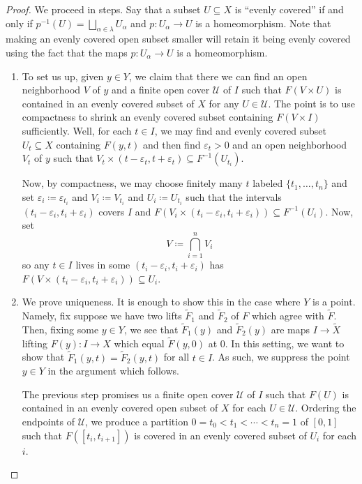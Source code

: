 \documentclass[../notes.tex]{subfiles}
\begin{document}
\begin{proof}
	We proceed in steps. Say that a subset $U\subseteq X$ is ``evenly covered'' if and only if $p^{-1}(U)=\bigsqcup_{\alpha\in\lambda}U_\alpha$ and $p\colon U_\alpha\to U$ is a homeomorphism. Note that making an evenly covered open subset smaller will retain it being evenly covered using the fact that the maps $p\colon U_\alpha\to U$ is a homeomorphism.
	\begin{enumerate}
		\item To set us up, given $y\in Y$, we claim that there we can find an open neighborhood $V$ of $y$ and a finite open cover $\mathcal U$ of $I$ such that $F(V\times U)$ is contained in an evenly covered subset of $X$ for any $U\in\mathcal U$. The point is to use compactness to shrink an evenly covered subset containing $F(V\times I)$ sufficiently. Well, for each $t\in I$, we may find and evenly covered subset $U_t\subseteq X$ containing $F(y,t)$ and then find $\varepsilon_t>0$ and an open neighborhood $V_t$ of $y$ such that $V_t\times(t-\varepsilon_t,t+\varepsilon_t)\subseteq F^{-1}(U_{t_i})$.

		Now, by compactness, we may choose finitely many $t$ labeled $\{t_1,\ldots,t_n\}$ and set $\varepsilon_i\coloneqq\varepsilon_{t_i}$ and $V_i\coloneqq V_{t_i}$ and $U_i\coloneqq U_{t_i}$ such that the intervals $(t_i-\varepsilon_i,t_i+\varepsilon_i)$ covers $I$ and $F(V_i\times(t_i-\varepsilon_i,t_i+\varepsilon_i))\subseteq F^{-1}(U_i)$. Now, set
		\[V\coloneqq\bigcap_{i=1}^nV_i\]
		so any $t\in I$ lives in some $(t_i-\varepsilon_i,t_i+\varepsilon_i)$ has $F(V\times(t_i-\varepsilon_i,t_i+\varepsilon_i))\subseteq U_i$.

		\item We prove uniqueness. It is enough to show this in the case where $Y$ is a point. Namely, fix suppose we have two lifts $\widetilde F_1$ and $\widetilde F_2$ of $F$ which agree with $\widetilde F$. Then, fixing some $y\in Y$, we see that $\widetilde F_1(y)$ and $\widetilde F_2(y)$ are maps $I\to\widetilde X$ lifting $F(y)\colon I\to X$ which equal $\widetilde F(y,0)$ at $0$. In this setting, we want to show that $\widetilde F_1(y,t)=\widetilde F_2(y,t)$ for all $t\in I$. As such, we suppress the point $y\in Y$ in the argument which follows.

		The previous step promises us a finite open cover $\mathcal U$ of $I$ such that $F(U)$ is contained in an evenly covered open subset of $X$ for each $U\in\mathcal U$. Ordering the endpoints of $\mathcal U$, we produce a partition $0=t_0<t_1<\cdots<t_n=1$ of $[0,1]$ such that $F([t_i,t_{i+1}])$ is covered in an evenly covered subset of $U_i$ for each $i$.


\end{enumerate}
\end{proof}
\end{document}
